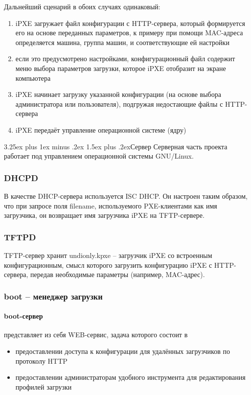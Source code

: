 \documentclass[11pt]{article}
\makeatletter
\renewcommand{\subsection}{\@startsection{subsection}{2}%
{\parindent}{3.25ex plus 1ex minus .2ex}%
{1.5ex plus .2ex}{\bfseries}}
\makeatother
\begin{document}
Дальнейший сценарий в обоих случаях одинаковый:
\begin{enumerate}
    \item iPXE загружает файл конфигурации с HTTP-сервера,
        который формируется его на основе переданных параметров,
        к примеру при помощи MAC-адреса определяется машина,
        группа машин, и соответствующие ей настройки
    \item если это предусмотрено настройками,
        конфигурационный файл содержит меню выбора параметров загрузки,
        которое iPXE отобразит на экране компьютера
    \item iPXE начинает загрузку указанной конфигурации (на основе выбора администратора
        или пользователя), подгружая недостающие файлы с HTTP-сервера
    \item iPXE передаёт управление операционной системе (ядру)
\end{enumerate}

\subsection{Сервер}
Серверная часть проекта работает под управлением операционной
системы GNU/Linux.

\subsubsection{DHCPD}
В качестве DHCP-сервера используется ISC DHCP.
Он настроен таким образом, что при запросе поля
filename, используемого PXE-клиентами как имя
загрузчика, он возвращает имя загрузчика iPXE
на TFTP-сервере.

\subsubsection{TFTPD}
TFTP-сервер хранит undionly.kpxe -- загрузчик iPXE
со встроенным конфигурационным, смысл которого загрузить
конфигурацию iPXE с HTTP-сервера, передав необходимые параметры
(например, MAC-адрес).

\subsubsection{boot -- менеджер загрузки}

\paragraph{boot-сервер} представляет из себя WEB-сервис, задача которого состоит в
\begin{itemize}
    \item предоставлении доступа к конфигурации для удалённых загрузчиков по протоколу HTTP
    \item предоставлении администраторам удобного инструмента для редактирования профилей загрузки
\end{itemize}
\end{document}
